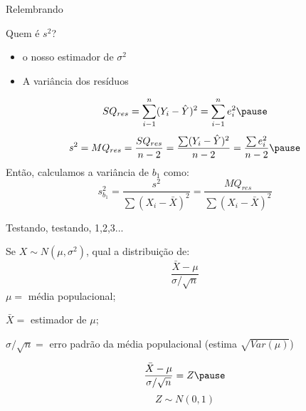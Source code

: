 \documentclass{beamer}\usepackage[]{graphicx}\usepackage[]{color}
\begin{document}
\begin{frame}{Relembrando}


Quem é $s^2$? \pause
\vfill
\begin{itemize}
\item o nosso estimador de $\sigma^2$ \pause 
\vfill
\item A variância dos resíduos \pause
\end{itemize}

\begin{equation*}
SQ_{res} =\sum_{i-1}^{n}(Y_i - \hat Y)^2 = \sum_{i-1}^{n}e_i^2 \pause
\end{equation*}
\begin{equation*}
s^2 = MQ_{res} = \frac{SQ_{res}}{n-2} = \frac{\sum(Y_i - \hat Y)^2}{n-2} = \frac{\sum e_i^2}{n-2} \pause
\end{equation*}
\vfill
Então, calculamos a variância de $b_1$ como: 
\begin{equation*}
s^2_{b_1} = \frac{s^2}{\sum (X_i-\bar X)^2} = \frac{MQ_{res}}{\sum (X_i-\bar X)^2}
\end{equation*}

\end{frame}


\begin{frame}{Testando, testando, 1,2,3...}

\begin{small}

Se $X \sim N(\mu,\sigma^2)$, qual a distribuição de:
\vfill
\begin{equation*}
\frac{\bar X - \mu}{\sigma / \sqrt{n}} 
\end{equation*} \pause
\vfill
$\mu=$ média populacional; 

$\bar X =$ estimador de $\mu$; 

$\sigma / \sqrt{n} =$ erro padrão da média populacional (estima $\sqrt{Var(\mu)}$)\pause

\begin{equation*}
\frac{\bar X - \mu}{\sigma / \sqrt{n}} = Z \pause
\end{equation*}
\vfill
\begin{equation*}
Z \sim N(0,1) 
\end{equation*}

\end{small}

\end{frame}
\end{document}
